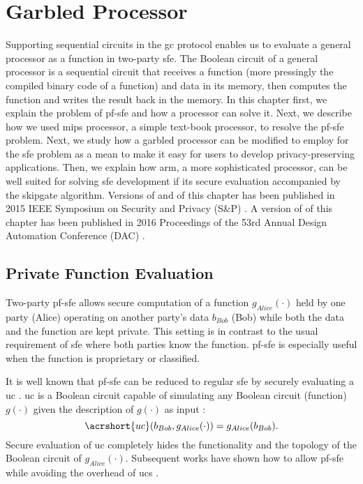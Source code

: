 \chapter{Garbled Processor}\label{chap:processor}
Supporting sequential circuits in the \acrfull{gc} protocol enables us to evaluate a general processor as a function in two-party \acrfull{sfe}.
The Boolean circuit of a general processor is a sequential circuit that receives a function (more pressingly the compiled binary code of a function) and data in its memory, then computes the function and writes the result back in the memory.
In this chapter first, we explain the problem of \acrfull{pf-sfe} and how a processor can solve it.
Next, we describe how we used \gls{mips} processor, a simple text-book processor, to resolve the \acrshort{pf-sfe} problem.
Next, we study how a garbled processor can be modified to employ for the \acrshort{sfe} problem as a mean to make it easy for users to develop privacy-preserving applications.
Then, we explain how \gls{arm}, a more sophisticated processor, can be well suited for solving \acrshort{sfe} development if its secure evaluation accompanied by the \gls{skipgate} algorithm.
Versions of  and  of this chapter has been published in 2015 IEEE Symposium on Security and Privacy (S\&P) \cite{songhori2015tinygarble}.
A version of  of this chapter has been published in 2016 Proceedings of the 53rd Annual Design Automation Conference (DAC) \cite{songhori2016garbledcpu}.


\section{Private Function Evaluation}\label{sec:processor-pfsfe}
Two-party \acrfull{pf-sfe} allows secure computation of a function $g_{Alice}(\cdot)$ held by one party (Alice) operating on another party's data $b_{Bob}$ (Bob) while both the data and the function are kept private.
This setting is in contrast to the usual requirement of \acrshort{sfe} where both parties know the function.
\acrshort{pf-sfe} is especially useful when the function is proprietary or classified.

It is well known that \acrshort{pf-sfe} can be reduced to regular \acrshort{sfe} by securely evaluating a \acrfull{uc} \cite{sander1999non}.
\acrshort{uc} is a Boolean circuit capable of simulating any Boolean circuit (function) $g(\cdot)$ given the description of $g(\cdot)$ as input \cite{valiant1976universal,kolesnikov2008practical}:
$$\acrshort{uc}(b_{Bob},g_{Alice}(\cdot)) = g_{Alice}(b_{Bob}).$$
Secure evaluation of \acrshort{uc} completely hides the functionality and the topology of the Boolean circuit of $g_{Alice}(\cdot)$.
Subsequent works have shown how to allow \acrshort{pf-sfe} while avoiding the overhead of \acrshort{uc}s \cite{katz2011constant, mohassel2013hide}.

